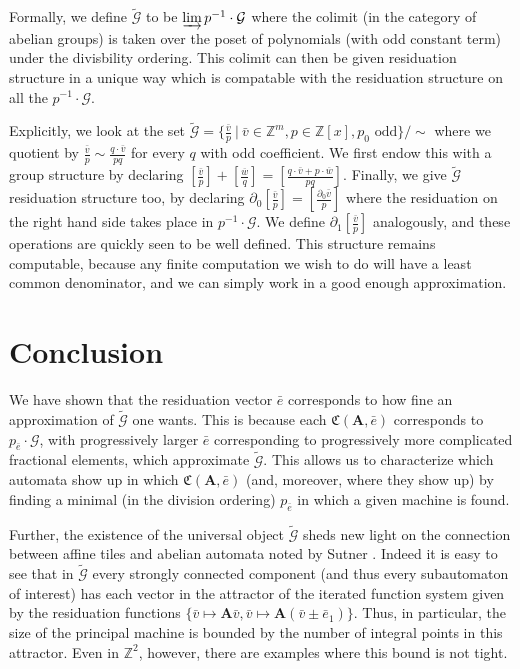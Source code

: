 \documentclass[runningheads]{llncs}
\newcommand{\G}{\mathcal{G}}
\newcommand{\C}{\mathfrak{C}(\Am,\e)}
\newcommand{\Z}{\mathbb{Z}}
\newcommand{\2}{\textbf{2}}
\newcommand{\Am}{\textbf{A}}
\newcommand{\del}{\partial}
\newcommand{\vv}{\bar{v}}
\newcommand{\e}{\bar{e}}
\begin{document}
Formally, we define $\widetilde{\G}$ to be $\varinjlim p^{-1} \cdot \G$ 
where the colimit (in the category of abelian groups) is taken over the poset 
of polynomials (with odd constant term) under the divisbility ordering. This 
colimit can then be given residuation structure in a unique way which is 
compatable with the residuation structure on all the $p^{-1} \cdot \G$.

Explicitly, we look at the set 
$\widetilde{\G} = \{ \frac{\vv}{p} ~|~ \vv \in \Z^m, p \in \Z[x], p_0 \text{ odd} \} / \sim$
where we quotient by $\frac{\vv}{p} \sim \frac{q \cdot \vv}{pq}$ for every
$q$ with odd coefficient. We first endow this with a group structure by
declaring $[\frac{\vv}{p}] + [\frac{\overline{w}}{q}] = 
[\frac{q \cdot \vv + p \cdot \overline{w}}{pq}]$. Finally, we give
$\widetilde{\G}$ residuation structure too, by declaring 
$\del_0 [\frac{\vv}{p}] = [\frac{\del_0 \vv}{p}]$ where the residuation
on the right hand side takes place in $p^{-1} \cdot \G$. We define 
$\del_1 [\frac{\vv}{p}]$ analogously, and these operations are quickly seen
to be well defined.  This structure remains computable, because any finite 
computation we wish to do will have a least common denominator, and we can
simply work in a good enough approximation.

\section{Conclusion}
We have shown that the residuation vector $\e$ corresponds to how fine an
approximation of $\widetilde{\G}$ one wants. This is because each $\C$ 
corresponds to $p_{\e} \cdot \G$, with progressively larger $\e$ 
corresponding to progressively more complicated fractional elements, which
approximate $\widetilde{\G}$. This allows us to characterize which automata
show up in which $\C$ (and, moreover, where they show up) by finding a minimal 
(in the division ordering) $p_{\e}$ in which a given machine is found.

Further, the existence of the universal object $\widetilde{\G}$ 
sheds new light on the connection between affine tiles
\cite{LagariasWang96:tiles,LagariasWang97:integral_tiles}
and abelian automata noted by Sutner
\cite{Sutner18:abelian_automata}. 
Indeed it is easy to see that in 
$\widetilde{\G}$ every strongly connected component 
(and thus every subautomaton of interest) has each vector in the attractor 
of the iterated function system given by the residuation functions 
$\{ \vv \mapsto \Am \vv, \vv \mapsto \Am (\vv \pm \e_1) \}$.
Thus, in particular, the size of the principal machine is bounded by the
number of integral points in this attractor. Even in $\Z^2$, however, there
are examples where this bound is not tight.
\end{document}
